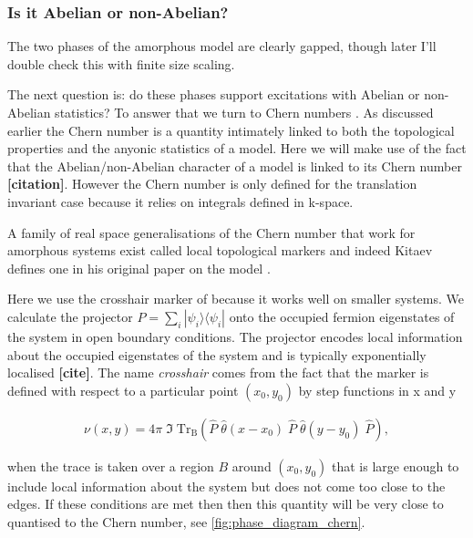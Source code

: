 \hypertarget{is-it-abelian-or-non-abelian}{%
\subsubsection{Is it Abelian or non-Abelian?}\label{is-it-abelian-or-non-abelian}}

The two phases of the amorphous model are clearly gapped, though later I'll double check this with finite size scaling.

The next question is: do these phases support excitations with Abelian or non-Abelian statistics? To answer that we turn to Chern numbers \autocite{berryQuantalPhaseFactors1984,simonHolonomyQuantumAdiabatic1983,thoulessQuantizedHallConductance1982}. As discussed earlier the Chern number is a quantity intimately linked to both the topological properties and the anyonic statistics of a model. Here we will make use of the fact that the Abelian/non-Abelian character of a model is linked to its Chern number \textbf{{[}citation{]}}. However the Chern number is only defined for the translation invariant case because it relies on integrals defined in k-space.

A family of real space generalisations of the Chern number that work for amorphous systems exist called local topological markers \autocite{bianco_mapping_2011,Hastings_Almost_2010,mitchellAmorphousTopologicalInsulators2018} and indeed Kitaev defines one in his original paper on the model \autocite{kitaevAnyonsExactlySolved2006}.

Here we use the crosshair marker of \autocite{peru_preprint} because it works well on smaller systems. We calculate the projector \(P = \sum_i |\psi_i\rangle \langle \psi_i|\) onto the occupied fermion eigenstates of the system in open boundary conditions. The projector encodes local information about the occupied eigenstates of the system and is typically exponentially localised \textbf{{[}cite{]}}. The name \emph{crosshair} comes from the fact that the marker is defined with respect to a particular point \((x_0, y_0)\) by step functions in x and y

\[\begin{aligned}
    \nu (x, y) = 4\pi \; \Im\; \mathrm{Tr}_{\mathrm{B}} 
    \left ( 
    \hat{P}\;\hat{\theta}(x-x_0)\;\hat{P}\;\hat{\theta}(y-y_0)\; \hat{P}
    \right ),
\end{aligned}\]

when the trace is taken over a region \(B\) around \((x_0, y_0)\) that is large enough to include local information about the system but does not come too close to the edges. If these conditions are met then then this quantity will be very close to quantised to the Chern number, see \cref{fig:phase_diagram_chern}.

